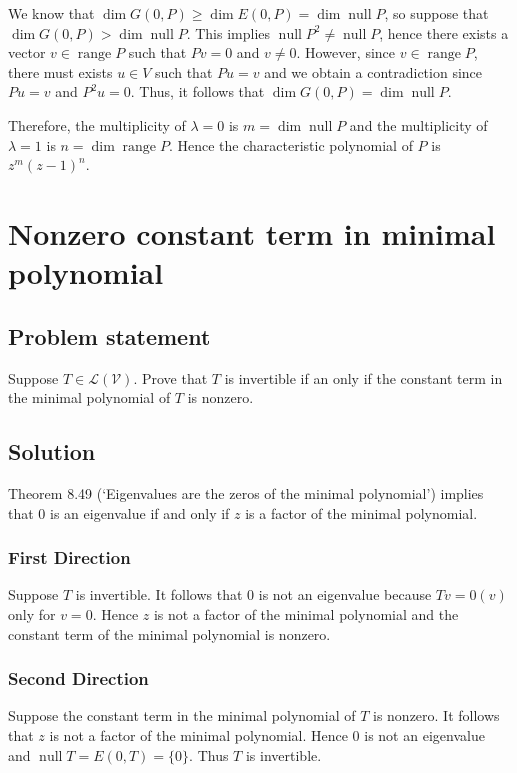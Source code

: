 \documentclass{article}
\begin{document}
We know that $\operatorname{dim}G(0,P)\geq \operatorname{dim}E(0,P)=\operatorname{dim}\operatorname{null}P$, so suppose that \newline $\operatorname{dim}G(0,P)> \operatorname{dim}\operatorname{null}P$. 
This implies $\operatorname{null}P^2\neq\operatorname{null}P$, hence there exists a vector $v\in\operatorname{range}P$ such that $Pv=0$ and $v\neq 0$. 
However, since $v\in\operatorname{range}P$, there must exists $u\in V$ such that $Pu=v$ and we obtain a contradiction since $Pu=v$ and $P^2u=0$. 
Thus, it follows that $\operatorname{dim}G(0,P)=\operatorname{dim}\operatorname{null}P$.

Therefore, the multiplicity of $\lambda=0$ is $m=\operatorname{dim}\operatorname{null}P$ and the multiplicity of $\lambda=1$ is $n=\operatorname{dim}\operatorname{range}P$. 
Hence the characteristic polynomial of $P$ is $z^m(z-1)^n$.

\clearpage

\section{Nonzero constant term in minimal polynomial}
\subsection*{Problem statement}
Suppose $T\in\mathcal{L(V)}$. Prove that $T$ is invertible if an only if the constant term in the minimal polynomial of $T$ is nonzero.

\subsection*{Solution}
Theorem 8.49 (`Eigenvalues are the zeros of the minimal polynomial') implies that $0$ is an eigenvalue if and only if $z$ is a factor of the minimal polynomial.

\subsubsection{First Direction}
Suppose $T$ is invertible. 
It follows that $0$ is not an eigenvalue because $Tv=0(v)$ only for $v=0$. 
Hence $z$ is not a factor of the minimal polynomial and the constant term of the minimal polynomial is nonzero.

\subsubsection{Second Direction}
Suppose the constant term in the minimal polynomial of $T$ is nonzero. It follows that $z$ is not a factor of the minimal polynomial. Hence $0$ is not an eigenvalue and $\operatorname{null}T=E(0,T)=\{0\}$. 
Thus $T$ is invertible.
\end{document}
